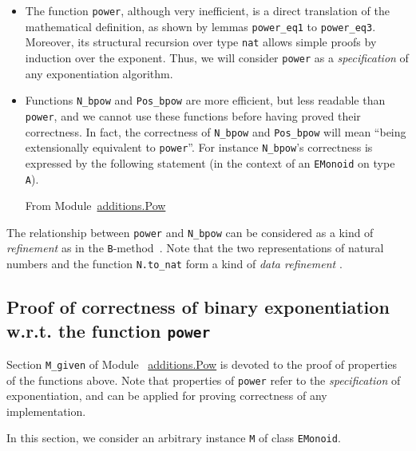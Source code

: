 \begin{itemize}
\item The function \texttt{power}, although very inefficient, is a direct 
translation of the mathematical definition, as shown by  lemmas \texttt{power\_eq1} to \linebreak \texttt{power\_eq3}. Moreover, its structural recursion over type \texttt{nat} allows simple proofs by induction over the exponent. 
Thus, we will consider \texttt{power} as a \emph{specification} of any exponentiation algorithm.

\item Functions \texttt{N\_bpow} and \texttt{Pos\_bpow} are more efficient, but less readable than \texttt{power}, and we cannot use these functions before 
having proved their correctness. In fact, the correctness of 
\texttt{N\_bpow} and \texttt{Pos\_bpow} will mean ``being extensionally equivalent to \texttt{power}''.
For instance \texttt{N\_bpow}'s correctness is expressed by the following
statement (in the context of an \texttt{EMonoid} on type \texttt{A}).


\vspace{4pt}
From Module~\href{../theories/html/additions.Pow.html}{additions.Pow}

\end{itemize}


The relationship between \texttt{power} and \texttt{N\_bpow} can be considered
as a kind of \emph{refinement} as in the \texttt{B}-method~\cite{b-book}. Note
that the two representations of natural numbers and the function \texttt{N.to\_nat}
form a kind of  \emph{data refinement} \cite{Abrial:2010:MES:1855020, Cohen2013}.



\subsection{Proof of correctness of binary exponentiation w.r.t. the function \texttt{power}}
Section \texttt{M\_given} of Module 
~\href{../theories/html/additions.Pow.html}{additions.Pow} is devoted to the proof 
of properties of the functions above.
Note that properties of \texttt{power} refer to the \emph{specification} of exponentiation, and can be applied for proving correctness of any implementation.

In this section, we consider an arbitrary instance  \texttt{M} of class \texttt{EMonoid}.


